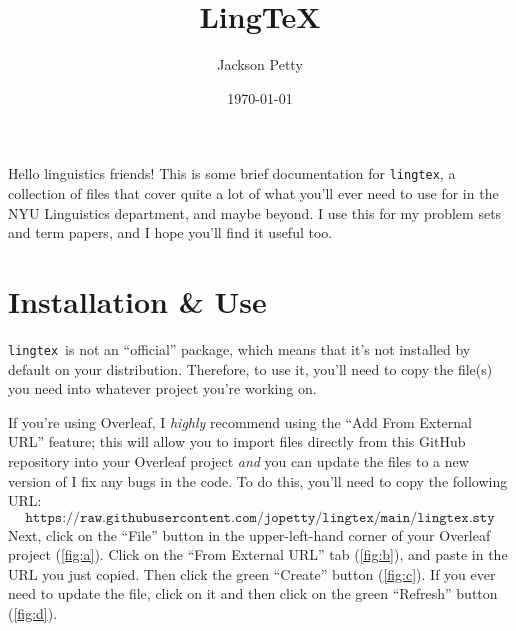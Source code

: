 \documentclass{article}
\title{Ling\TeX}
\author{Jackson Petty}
\date{\today}
\def\lingtex{\texttt{lingtex}}
\begin{document}
\maketitle

\noindent
Hello linguistics friends! This is some brief documentation for \texttt{lingtex}, a collection of  files that cover quite a lot of what you'll ever need to use  for in the NYU Linguistics department, and maybe beyond. I use this for my problem sets and term papers, and I hope you'll find it useful too.

\section{Installation \& Use} \label{sec:installation-use}

\lingtex\ is not an \enquote{official}  package, which means that it's not installed by default on your  distribution. Therefore, to use it, you'll need to copy the file(s) you need into whatever project you're working on.

If you're using Overleaf, I \emph{highly} recommend using the \enquote{Add From External URL} feature; this will allow you to import files directly from this GitHub repository into your Overleaf project \emph{and} you can update the files to a new version of I fix any bugs in the code. To do this, you'll need to copy the following URL:
$$
    \texttt{https://raw.githubusercontent.com/jopetty/lingtex/main/lingtex.sty}
$$
Next, click on the \enquote{File} button in the upper-left-hand corner of your Overleaf project (\ref{fig:a}). Click on the \enquote{From External URL} tab (\ref{fig:b}), and paste in the URL you just copied.  Then click the green \enquote{Create} button (\ref{fig:c}). If you ever need to update the file, click on it and then click on the green \enquote{Refresh} button (\ref{fig:d}).
\end{document}
